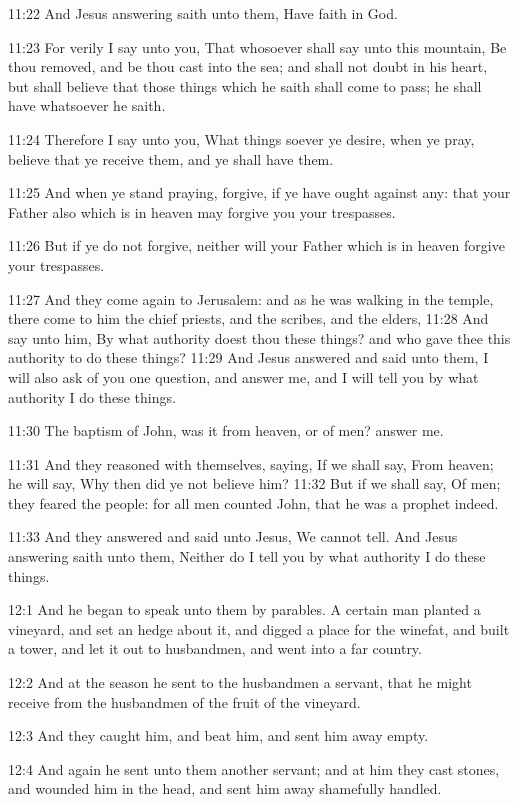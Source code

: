 11:22 And Jesus answering saith unto them, Have faith in God.

11:23 For verily I say unto you, That whosoever shall say unto this
mountain, Be thou removed, and be thou cast into the sea; and shall
not doubt in his heart, but shall believe that those things which he
saith shall come to pass; he shall have whatsoever he saith.

11:24 Therefore I say unto you, What things soever ye desire, when ye
pray, believe that ye receive them, and ye shall have them.

11:25 And when ye stand praying, forgive, if ye have ought against
any: that your Father also which is in heaven may forgive you your
trespasses.

11:26 But if ye do not forgive, neither will your Father which is in
heaven forgive your trespasses.

11:27 And they come again to Jerusalem: and as he was walking in the
temple, there come to him the chief priests, and the scribes, and the
elders, 11:28 And say unto him, By what authority doest thou these
things? and who gave thee this authority to do these things?  11:29
And Jesus answered and said unto them, I will also ask of you one
question, and answer me, and I will tell you by what authority I do
these things.

11:30 The baptism of John, was it from heaven, or of men? answer me.

11:31 And they reasoned with themselves, saying, If we shall say, From
heaven; he will say, Why then did ye not believe him?  11:32 But if we
shall say, Of men; they feared the people: for all men counted John,
that he was a prophet indeed.

11:33 And they answered and said unto Jesus, We cannot tell. And Jesus
answering saith unto them, Neither do I tell you by what authority I
do these things.

12:1 And he began to speak unto them by parables. A certain man
planted a vineyard, and set an hedge about it, and digged a place for
the winefat, and built a tower, and let it out to husbandmen, and went
into a far country.

12:2 And at the season he sent to the husbandmen a servant, that he
might receive from the husbandmen of the fruit of the vineyard.

12:3 And they caught him, and beat him, and sent him away empty.

12:4 And again he sent unto them another servant; and at him they cast
stones, and wounded him in the head, and sent him away shamefully
handled.

